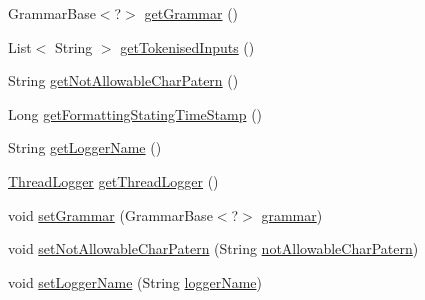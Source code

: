 \begin{DoxyCompactItemize}
\item 
Grammar\-Base$<$?$>$ \hyperlink{classit_1_1emarolab_1_1cagg_1_1core_1_1evaluation_1_1inputFormatting_1_1InputFormatterBase_aa9d03dde68438c66d4d498632bfd9f50}{get\-Grammar} ()
\item 
List$<$ String $>$ \hyperlink{classit_1_1emarolab_1_1cagg_1_1core_1_1evaluation_1_1inputFormatting_1_1InputFormatterBase_ab81ddce21a73a64655d3fd877140c192}{get\-Tokenised\-Inputs} ()
\item 
String \hyperlink{classit_1_1emarolab_1_1cagg_1_1core_1_1evaluation_1_1inputFormatting_1_1InputFormatterBase_a920c1b637c8f8e9dc7ce6f2d6a3b8739}{get\-Not\-Allowable\-Char\-Patern} ()
\item 
Long \hyperlink{classit_1_1emarolab_1_1cagg_1_1core_1_1evaluation_1_1inputFormatting_1_1InputFormatterBase_a5cadab266e4db5ef2151579551a4f1ec}{get\-Formatting\-Stating\-Time\-Stamp} ()
\item 
String \hyperlink{classit_1_1emarolab_1_1cagg_1_1core_1_1evaluation_1_1inputFormatting_1_1InputFormatterBase_a19adf34aab188dbf9ef5b49d4f8a3157}{get\-Logger\-Name} ()
\item 
\hyperlink{classit_1_1emarolab_1_1cagg_1_1core_1_1evaluation_1_1CaggThread_1_1ThreadLogger}{Thread\-Logger} \hyperlink{classit_1_1emarolab_1_1cagg_1_1core_1_1evaluation_1_1inputFormatting_1_1InputFormatterBase_a582a52f22020cdeb7b16169559ad170c}{get\-Thread\-Logger} ()
\item 
void \hyperlink{classit_1_1emarolab_1_1cagg_1_1core_1_1evaluation_1_1inputFormatting_1_1InputFormatterBase_a7c0832baf78251c4e6525c859509460d}{set\-Grammar} (Grammar\-Base$<$?$>$ \hyperlink{classit_1_1emarolab_1_1cagg_1_1core_1_1evaluation_1_1inputFormatting_1_1InputFormatterBase_a3de6c039296a18f821706f1b8e0cb2a5}{grammar})
\item 
void \hyperlink{classit_1_1emarolab_1_1cagg_1_1core_1_1evaluation_1_1inputFormatting_1_1InputFormatterBase_a65abef37e70482edfb39f16a1db0c9e0}{set\-Not\-Allowable\-Char\-Patern} (String \hyperlink{classit_1_1emarolab_1_1cagg_1_1core_1_1evaluation_1_1inputFormatting_1_1InputFormatterBase_af8c1c79313632272c67711704784ef13}{not\-Allowable\-Char\-Patern})
\item 
void \hyperlink{classit_1_1emarolab_1_1cagg_1_1core_1_1evaluation_1_1inputFormatting_1_1InputFormatterBase_ab12ecfa46d4e6c87d747aa05631f1191}{set\-Logger\-Name} (String \hyperlink{classit_1_1emarolab_1_1cagg_1_1core_1_1evaluation_1_1inputFormatting_1_1InputFormatterBase_a056ceacafad1bfa504e41694d410b6e7}{logger\-Name})
\item 

\end{DoxyCompactItemize}
